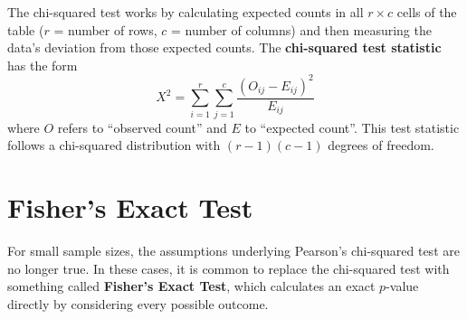 The chi-squared test works by calculating expected counts in all $r \times c$ cells of the table ($r$ = number of rows, $c$ = number of columns) and then measuring the data's deviation from those expected counts. The \textbf{chi-squared test statistic} has the form
$$ X^2 = \sum_{i=1}^r \sum_{j=1}^c \frac{(O_{ij} - E_{ij})^2}{E_{ij}} $$
where $O$ refers to ``observed count'' and $E$ to ``expected count''. This test statistic follows a chi-squared distribution with $(r-1)(c-1)$ degrees of freedom.


\section{Fisher's Exact Test}

For small sample sizes, the assumptions underlying Pearson's chi-squared test are no longer true. In these cases, it is common to replace the chi-squared test with something called \textbf{Fisher's Exact Test}, which calculates an exact $p$-value directly by considering every possible outcome. 




